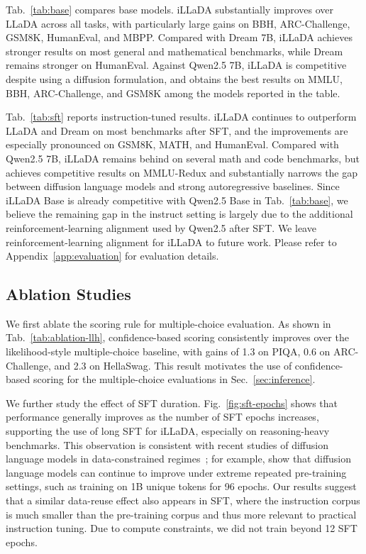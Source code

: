 \documentclass[]{bytedance_seed}
\begin{document}
Tab.~\ref{tab:base} compares base models. iLLaDA substantially improves over LLaDA across all tasks, with particularly large gains on BBH, ARC-Challenge, GSM8K, HumanEval, and MBPP. Compared with Dream 7B, iLLaDA achieves stronger results on most general and mathematical benchmarks, while Dream remains stronger on HumanEval. Against Qwen2.5 7B, iLLaDA is competitive despite using a diffusion formulation, and obtains the best results on MMLU, BBH, ARC-Challenge, and GSM8K among the models reported in the table.




Tab.~\ref{tab:sft} reports instruction-tuned results. iLLaDA continues to outperform LLaDA and Dream on most benchmarks after SFT, and the improvements are especially pronounced on GSM8K, MATH, and HumanEval. Compared with Qwen2.5 7B, iLLaDA remains behind on several math and code benchmarks, but achieves competitive results on MMLU-Redux and substantially narrows the gap between diffusion language models and strong autoregressive baselines. Since iLLaDA Base is already competitive with Qwen2.5 Base in Tab.~\ref{tab:base}, we believe the remaining gap in the instruct setting is largely due to the additional reinforcement-learning alignment used by Qwen2.5 after SFT. We leave reinforcement-learning alignment for iLLaDA to future work. Please refer to Appendix~\ref{app:evaluation} for evaluation details.





\subsection{Ablation Studies}
\label{sec:ablation}

We first ablate the scoring rule for multiple-choice evaluation. As shown in Tab.~\ref{tab:ablation-llh}, confidence-based scoring consistently improves over the likelihood-style multiple-choice baseline, with gains of 1.3 on PIQA, 0.6 on ARC-Challenge, and 2.3 on HellaSwag. This result motivates the use of confidence-based scoring for the multiple-choice evaluations in Sec.~\ref{sec:inference}.



We further study the effect of SFT duration. Fig.~\ref{fig:sft-epochs} shows that performance generally improves as the number of SFT epochs increases, supporting the use of long SFT for iLLaDA, especially on reasoning-heavy benchmarks. This observation is consistent with recent studies of diffusion language models in data-constrained regimes~\citep{prabhudesai2025diffusion,ni2025diffusion}; for example, \citet{ni2025diffusion} show that diffusion language models can continue to improve under extreme repeated pre-training settings, such as training on 1B unique tokens for 96 epochs. Our results suggest that a similar data-reuse effect also appears in SFT, where the instruction corpus is much smaller than the pre-training corpus and thus more relevant to practical instruction tuning. Due to compute constraints, we did not train beyond 12 SFT epochs.
\end{document}
